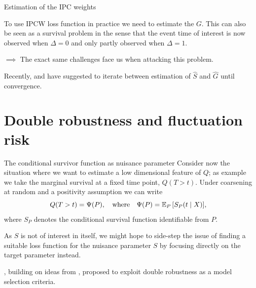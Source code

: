 \documentclass[smaller]{beamer}\usepackage{listings}
\begin{document}
\begin{frame}[label={sec:org192e61c}]{Estimation of the IPC weights}
\small

To use IPCW loss function in practice we need to estimate the \(G\). This can also be seen as a
survival problem in the sense that the event time of interest is now observed when \(\Delta =0\) and
only partly observed when \(\Delta =1\).

\vfill

\(\implies\) The exact same challenges face us when attacking this problem.

\vfill

\def\shift{2.3}
\def\ls{}
\def\lw{.5mm}
\begin{center}
\end{center}

\vfill

Recently, \cite{han2021inverse} and \cite{westling2021inference} have suggested to iterate between
estimation of \(\hat S\) and \(\hat G\) until convergence.
\end{frame}


\section{Double robustness and fluctuation risk}
\label{sec:org320a4b1}
\begin{frame}[label={sec:org0f3a4ab}]{The conditional survivor function as nuisance parameter}
Consider now the situation where we want to estimate a low dimensional feature of \(Q\); as example
we take the marginal survival at a fixed time point, \(Q(T > t)\). Under coarsening at random and a
positivity assumption we can write
\begin{equation*}
  Q(T > t) = \Psi(P),
  \quad \text{where} \quad
  \Psi(P) = \operatorname{\mathbb{E}}_P{\left[ S_P(t \mid X) \right]},
\end{equation*}
where \(S_P\) denotes the conditional survival function identifiable from \(P\). 

\vfill

As \(S\) is not of interest in itself, we might hope to side-step the issue of finding a suitable
loss function for the nuisance parameter \(S\) by focusing directly on the target parameter instead.

\vfill

\cite{tchetgenYifanTagetDML}, building on ideas from \cite{robins2007comment}, proposed to exploit
double robustness as a model selection criteria.
\end{frame}
\end{document}
